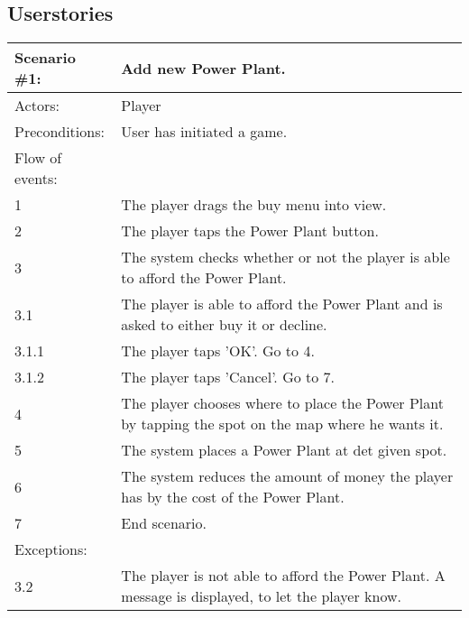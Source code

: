 \subsection{Userstories}


\begin{tabular}{| l | p{10cm} |}
	\hline
	{\bf Scenario \#1:} & {\bf Add new Power Plant.} \\ \hline
	Actors: & Player \\ \hline
	Preconditions: & User has initiated a game. \\ \hline
	Flow of events: &  \\ \hline
	1 & The player drags the buy menu into view. \\ \hline
	2 & The player taps the Power Plant button. \\ \hline
	3 & The system checks whether or not the player is able to afford the Power Plant. \\ \hline
	3.1 & The player is able to afford the Power Plant and is asked to either buy it or decline. \\ \hline
	3.1.1 & The player taps 'OK'. Go to 4. \\ \hline
	3.1.2 & The player taps 'Cancel'. Go to 7. \\ \hline
	4 & The player chooses where to place the Power Plant by tapping the spot on the map where he wants it. \\ \hline
	5 & The system places a Power Plant at det given spot. \\ \hline
	6 & The system reduces the amount of money the player has by the cost of the Power Plant. \\ \hline
	7 & End scenario. \\ \hline
	Exceptions: & \\ \hline
	3.2 & The player is not able to afford the Power Plant. A message is displayed, to let the player know. \\ \hline
\end{tabular}

